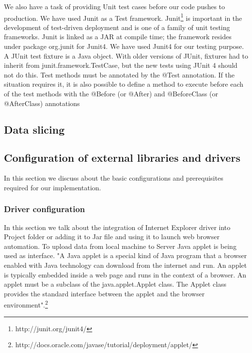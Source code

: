 \documentclass[article,type=msc,colorback,accentcolor=tud9c,twoside,11pt]{tudthesis}
\begin{document}
We also have a task of providing Unit test cases before our code pushes to production. We have used Junit as a Test framework. Junit\footnote{http://junit.org/junit4/} is important in the development of test-driven deployment and is one of a family of unit testing frameworks. Junit is linked as a JAR at compile time; the framework resides under package org.junit for Junit4. We have used Junit4 for our testing purpose. A JUnit test fixture is a Java object. With older versions of JUnit, fixtures had to inherit from junit.framework.TestCase, but the new tests using JUnit 4 should not do this. Test methods must be annotated by the @Test annotation. If the situation requires it, it is also possible to define a method to execute before  each of the test methods with the @Before (or @After) and @BeforeClass (or @AfterClass) annotations
\subsection{Data slicing}

\subsection{Configuration of external libraries and drivers}
In this section we discuss about the basic configurations and prerequisites required for our implementation.
\subsubsection{Driver configuration}
In this section we talk about the integration of Internet Explorer driver into Project folder or adding it to Jar file and using it to launch web browser automation. To upload data from local machine to Server Java applet is being used as interface. "A Java applet is a special kind of Java program that a browser enabled with Java technology can download from the internet and run. An applet is typically embedded inside a web page and runs in the context of a browser. An applet must be a subclass of the java.applet.Applet class. The Applet class provides the standard interface between the applet and the browser environment".\footnote{http://docs.oracle.com/javase/tutorial/deployment/applet/}
\end{document}
